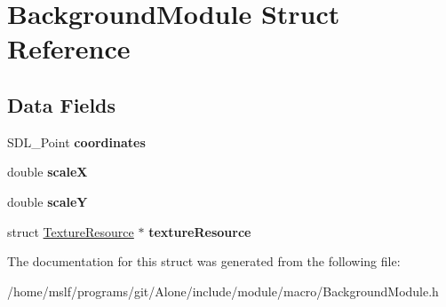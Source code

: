 \hypertarget{struct_background_module}{}\section{Background\+Module Struct Reference}
\label{struct_background_module}
\subsection*{Data Fields}
\begin{DoxyCompactItemize}
\item 
\hypertarget{struct_background_module_a667ad041f76f3b99c2ea65cd78b668ea}{}\label{struct_background_module_a667ad041f76f3b99c2ea65cd78b668ea} 
S\+D\+L\+\_\+\+Point {\bfseries coordinates}
\item 
\hypertarget{struct_background_module_af04d6c916584bdddd6a334359ff1059d}{}\label{struct_background_module_af04d6c916584bdddd6a334359ff1059d} 
double {\bfseries scaleX}
\item 
\hypertarget{struct_background_module_a936cc64e631dcd2b4ea124d5d8d4fe38}{}\label{struct_background_module_a936cc64e631dcd2b4ea124d5d8d4fe38} 
double {\bfseries scaleY}
\item 
\hypertarget{struct_background_module_aedd0da0c072332f83e64105f8682bbdf}{}\label{struct_background_module_aedd0da0c072332f83e64105f8682bbdf} 
struct \hyperlink{struct_texture_resource}{Texture\+Resource} $\ast$ {\bfseries texture\+Resource}
\end{DoxyCompactItemize}


The documentation for this struct was generated from the following file\+:\begin{DoxyCompactItemize}
\item 
/home/mslf/programs/git/\+Alone/include/module/macro/Background\+Module.\+h\end{DoxyCompactItemize}
